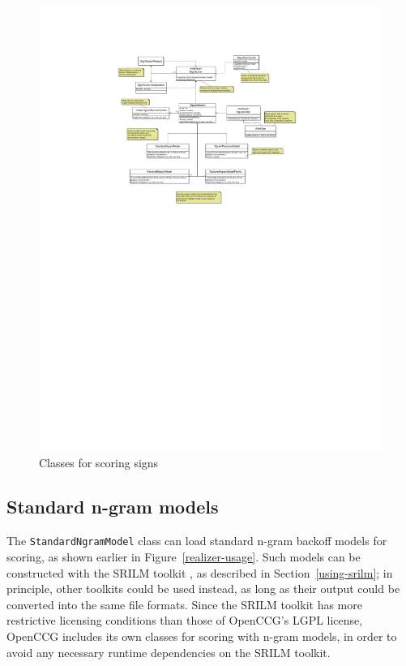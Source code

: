 \documentclass[11pt]{article}
\newcommand{\code}[1]{\texttt{#1}} %
\begin{document}
\begin{figure}%
\begin{center}
\mbox{}
\includegraphics[width=\textwidth]{scorer-class.pdf} 
\caption{Classes for scoring signs}
\label{scorer-class}
\end{center}
\end{figure}

\subsection{Standard n-gram models}
\label{standard-ngrams}

The \code{Standard\-Ngram\-Model} class can load standard n-gram backoff
models for scoring, as shown earlier in Figure~\ref{realizer-usage}.
Such models can be constructed with the SRILM toolkit
\cite{SRILM-ICSLP:2002}, as described in Section~\ref{using-srilm}; in
principle, other toolkits could be used instead, as long as their output
could be converted into the same file formats. Since the SRILM toolkit
has more restrictive licensing conditions than those of OpenCCG's LGPL
license, OpenCCG includes its own classes for scoring with n-gram
models, in order to avoid any necessary runtime dependencies on the
SRILM toolkit.
\end{document}
